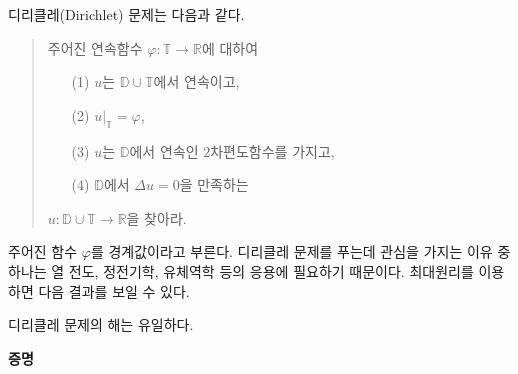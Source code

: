 디리클레(Dirichlet) 문제는 다음과 같다.
\begin{quote}
주어진 연속함수 $\varphi: \mathbb T \to \mathbb R$에 대하여
\begin{itemize}
\item[(1)] $u$는 $\mathbb D \cup \mathbb T$에서 연속이고,
\item[(2)] $u|_{\mathbb T}=\varphi$,
\item[(3)] $u$는 $\mathbb D$에서 연속인 $2$차편도함수를 가지고,
\item[(4)] $\mathbb D$에서 $\Delta u  = 0$을 만족하는
\end{itemize}
$u: \mathbb D \cup \mathbb T \to \mathbb R$을 찾아라.
\end{quote}

주어진 함수 $\varphi$를 경계값이라고 부른다.
디리클레 문제를 푸는데 관심을 가지는 이유 중 하나는
열 전도, 정전기학, 유체역학 등의 응용에 필요하기 때문이다.
최대원리를 이용하면 다음 결과를 보일 수 있다.

\begin{salt_prop}\label{prpo-5-1}
디리클레 문제의 해는 유일하다.
\end{salt_prop}

{\bf 증명}









